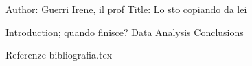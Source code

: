 Author: Guerri Irene, il prof 
Title: Lo sto copiando da lei


Introduction; quando finisce?
Data
Analysis
Conclusions

Referenze
bibliografia.tex

